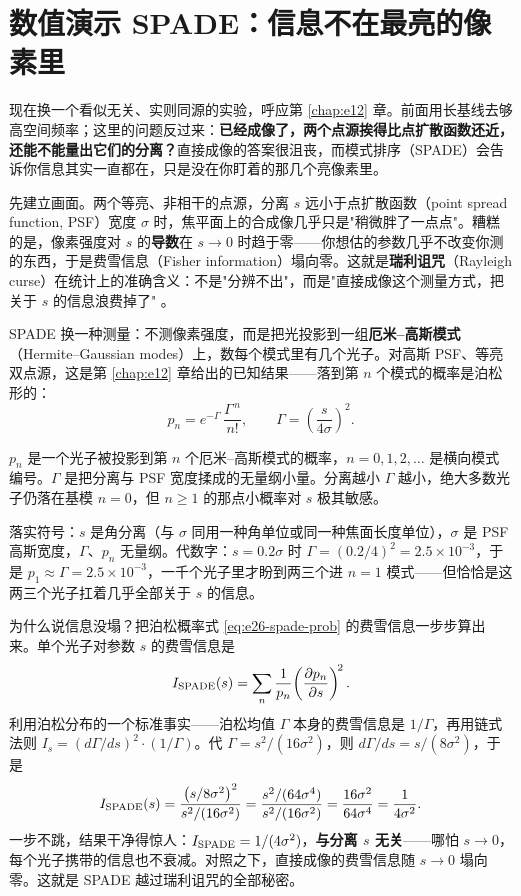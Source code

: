 \section{数值演示 SPADE：信息不在最亮的像素里}
\label{sec:e26-spade}

现在换一个看似无关、实则同源的实验，呼应第 \ref{chap:e12} 章。前面用长基线去够高空间频率；这里的问题反过来：\textbf{已经成像了，两个点源挨得比点扩散函数还近，还能不能量出它们的分离？}直接成像的答案很沮丧，而模式排序（SPADE）会告诉你信息其实一直都在，只是没在你盯着的那几个亮像素里。

先建立画面。两个等亮、非相干的点源，分离 \(s\) 远小于点扩散函数（point spread function, PSF）宽度 \(\sigma\) 时，焦平面上的合成像几乎只是"稍微胖了一点点"。糟糕的是，像素强度对 \(s\) 的\textbf{导数}在 \(s\to0\) 时趋于零——你想估的参数几乎不改变你测的东西，于是费雪信息（Fisher information）塌向零。这就是\textbf{瑞利诅咒}（Rayleigh curse）在统计上的准确含义：不是"分辨不出"，而是"直接成像这个测量方式，把关于 \(s\) 的信息浪费掉了" \citep{2015Optic...2..646T,2016PhRvX...6c1033T}。

SPADE 换一种测量：不测像素强度，而是把光投影到一组\textbf{厄米–高斯模式}（Hermite--Gaussian modes）上，数每个模式里有几个光子。对高斯 PSF、等亮双点源，这是第 \ref{chap:e12} 章给出的已知结果——落到第 \(n\) 个模式的概率是泊松形的：
\begin{equation}
  p_n=e^{-\Gamma}\,\frac{\Gamma^{\,n}}{n!},\qquad
  \Gamma=\left(\frac{s}{4\sigma}\right)^{\!2}.
  \label{eq:e26-spade-prob}
\end{equation}
\begin{formulaexplain}
\(p_n\) 是一个光子被投影到第 \(n\) 个厄米–高斯模式的概率，\(n=0,1,2,\dots\) 是横向模式编号。\(\Gamma\) 是把分离与 PSF 宽度揉成的无量纲小量。分离越小 \(\Gamma\) 越小，绝大多数光子仍落在基模 \(n=0\)，但 \(n\ge1\) 的那点小概率对 \(s\) 极其敏感。
\end{formulaexplain}
落实符号：\(s\) 是角分离（与 \(\sigma\) 同用一种角单位或同一种焦面长度单位），\(\sigma\) 是 PSF 高斯宽度，\(\Gamma\)、\(p_n\) 无量纲。代数字：\(s=0.2\sigma\) 时 \(\Gamma=(0.2/4)^2=2.5\times10^{-3}\)，于是 \(p_1\approx\Gamma=2.5\times10^{-3}\)，一千个光子里才盼到两三个进 \(n=1\) 模式——但恰恰是这两三个光子扛着几乎全部关于 \(s\) 的信息。

为什么说信息没塌？把泊松概率式 \eqref{eq:e26-spade-prob} 的费雪信息一步步算出来。单个光子对参数 \(s\) 的费雪信息是
\[
  I_{\rm SPADE}(s)=\sum_{n}\frac{1}{p_n}\!\left(\frac{\partial p_n}{\partial s}\right)^{\!2}.
\]
利用泊松分布的一个标准事实——泊松均值 \(\Gamma\) 本身的费雪信息是 \(1/\Gamma\)，再用链式法则 \(I_s=(d\Gamma/ds)^2\cdot(1/\Gamma)\)。代 \(\Gamma=s^2/(16\sigma^2)\)，则 \(d\Gamma/ds=s/(8\sigma^2)\)，于是
\[
  I_{\rm SPADE}(s)=\frac{\big(s/8\sigma^2\big)^2}{s^2/(16\sigma^2)}
  =\frac{s^2/(64\sigma^4)}{s^2/(16\sigma^2)}=\frac{16\sigma^2}{64\sigma^4}=\frac{1}{4\sigma^2}.
\]
一步不跳，结果干净得惊人：\(I_{\rm SPADE}=1/(4\sigma^2)\)，\textbf{与分离 \(s\) 无关}——哪怕 \(s\to0\)，每个光子携带的信息也不衰减。对照之下，直接成像的费雪信息随 \(s\to0\) 塌向零。这就是 SPADE 越过瑞利诅咒的全部秘密。

